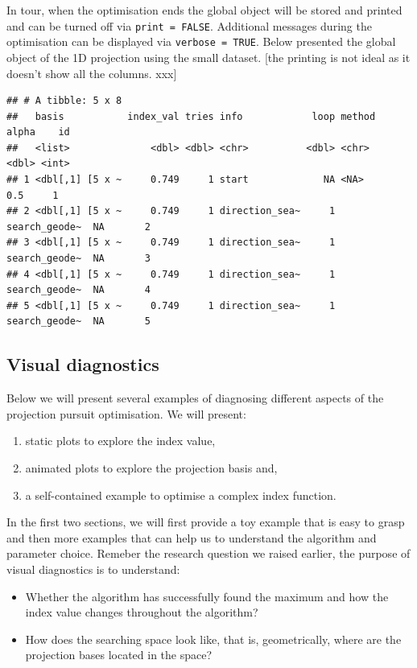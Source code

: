 \documentclass[12pt]{article}
\begin{document}
In tour, when the optimisation ends the global object will be stored and
printed and can be turned off via \texttt{print\ =\ FALSE}. Additional
messages during the optimisation can be displayed via
\texttt{verbose\ =\ TRUE}. Below presented the global object of the 1D
projection using the small dataset. {[}the printing is not ideal as it
doesn't show all the columns. xxx{]}

\begin{verbatim}
## # A tibble: 5 x 8
##   basis           index_val tries info            loop method        alpha    id
##   <list>              <dbl> <dbl> <chr>          <dbl> <chr>         <dbl> <int>
## 1 <dbl[,1] [5 x ~     0.749     1 start             NA <NA>            0.5     1
## 2 <dbl[,1] [5 x ~     0.749     1 direction_sea~     1 search_geode~  NA       2
## 3 <dbl[,1] [5 x ~     0.749     1 direction_sea~     1 search_geode~  NA       3
## 4 <dbl[,1] [5 x ~     0.749     1 direction_sea~     1 search_geode~  NA       4
## 5 <dbl[,1] [5 x ~     0.749     1 direction_sea~     1 search_geode~  NA       5
\end{verbatim}

\hypertarget{visual-diagnostics}{%
\subsection{Visual diagnostics}\label{visual-diagnostics}}

Below we will present several examples of diagnosing different aspects
of the projection pursuit optimisation. We will present:

\begin{enumerate}
\def\labelenumi{\arabic{enumi})}
\item
  static plots to explore the index value,
\item
  animated plots to explore the projection basis and,
\item
  a self-contained example to optimise a complex index function.
\end{enumerate}

In the first two sections, we will first provide a toy example that is
easy to grasp and then more examples that can help us to understand the
algorithm and parameter choice. Remeber the research question we raised
earlier, the purpose of visual diagnostics is to understand:

\begin{itemize}
\item
  Whether the algorithm has successfully found the maximum and how the
  index value changes throughout the algorithm?
\item
  How does the searching space look like, that is, geometrically, where
  are the projection bases located in the space?
\end{itemize}
\end{document}
